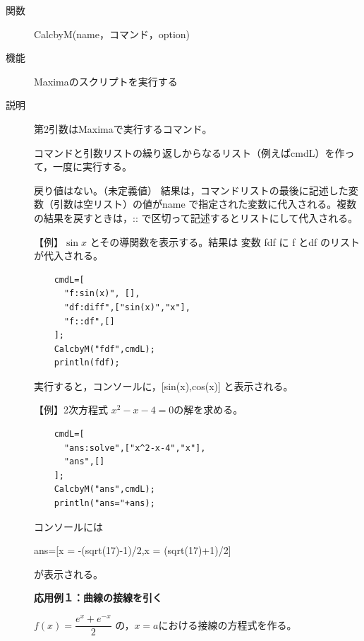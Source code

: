 \documentclass[papersize,a4paper,12pt,uplatex]{jsarticle}
\begin{document}
\begin{description}

\hypertarget{calcbyM}{}
\item[関数]  CalcbyM(name，コマンド，option)
\item[機能]  Maximaのスクリプトを実行する
\item[説明]  第2引数はMaximaで実行するコマンド。

コマンドと引数リストの繰り返しからなるリスト（例えばcmdL）を作って，一度に実行する。
  
戻り値はない。（未定義値）  結果は，コマンドリストの最後に記述した変数（引数は空リスト）の値がname で指定された変数に代入される。複数の結果を戻すときは，:: で区切って記述するとリストにして代入される。
  
\vspace{\baselineskip}
【例】$\sin x$ とその導関数を表示する。結果は 変数 fdf に f とdf のリストが代入される。
\begin{verbatim}
    cmdL=[
      "f:sin(x)", [],
      "df:diff",["sin(x)","x"],
      "f::df",[]
    ];
    CalcbyM("fdf",cmdL);
    println(fdf);
\end{verbatim}
\vspace{\baselineskip}
  実行すると，コンソールに，[sin(x),cos(x)]  と表示される。
  
\vspace{\baselineskip}
【例】2次方程式 $x^2-x-4=0$の解を求める。
\begin{verbatim}
    cmdL=[
      "ans:solve",["x^2-x-4","x"],
      "ans",[]
    ];
    CalcbyM("ans",cmdL);
    println("ans="+ans);
\end{verbatim}
  コンソールには
  
    ans=[x = -(sqrt(17)-1)/2,x = (sqrt(17)+1)/2] 
    
  が表示される。
  
\vspace{\baselineskip}
{\bf 応用例１：曲線の接線を引く}

\vspace{\baselineskip}
  $f(x)=\dfrac{e^x+e^{-x}}{2}$ の，$x=a$における接線の方程式を作る。
  

\end{description}
\end{document}
